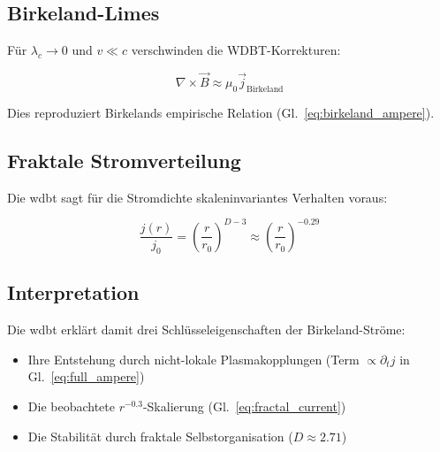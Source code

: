 \subsection{Birkeland-Limes}
Für $\lambda_c \to 0$ und $v \ll c$ verschwinden die WDBT-Korrekturen:

\begin{equation}
\nabla \times \vec{B} \approx \mu_0 \vec{j}_{\text{Birkeland}}
\label{eq:birkeland_limit}
\end{equation}

Dies reproduziert Birkelands empirische Relation (Gl.~\ref{eq:birkeland_ampere}).

\subsection{Fraktale Stromverteilung}
Die \gls{wdbt} sagt für die Stromdichte skaleninvariantes Verhalten voraus:

\begin{equation}
\frac{j(r)}{j_0} = \left(\frac{r}{r_0}\right)^{D-3} \approx \left(\frac{r}{r_0}\right)^{-0.29}
\label{eq:fractal_current}
\end{equation}

\subsection{Interpretation}
Die \gls{wdbt} erklärt damit drei Schlüsseleigenschaften der Birkeland-Ströme:
\begin{itemize}
\item Ihre Entstehung durch nicht-lokale Plasmakopplungen (Term $\propto \partial_t j$ in Gl.~\ref{eq:full_ampere})
\item Die beobachtete $r^{-0.3}$-Skalierung (Gl.~\ref{eq:fractal_current})
\item Die Stabilität durch fraktale Selbstorganisation ($D \approx 2.71$)
\end{itemize}
